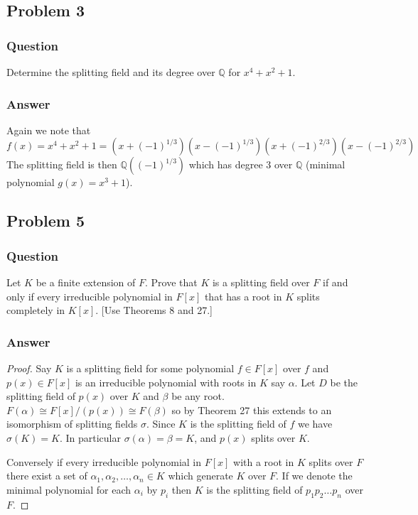 \documentclass[10pt]{article}
\begin{document}
\subsection{Problem 3}
\subsubsection{Question}
Determine the splitting field and its degree over $\mathbb{Q}$ for $x^4+x^2+1$.
\subsubsection{Answer}
Again we note that
\[f(x)=x^4+x^2+1=(x+(-1)^{1/3})(x-(-1)^{1/3})(x+(-1)^{2/3})(x-(-1)^{2/3})\]
The splitting field is then $\mathbb{Q}((-1)^{1/3})$ which has degree 3 over $\mathbb{Q}$ (minimal polynomial $g(x)=x^3+1$).

\subsection{Problem 5}
\subsubsection{Question}
Let $K$ be a finite extension of $F$. Prove that $K$ is a splitting field over $F$ if and only if every irreducible polynomial in $F[x]$ that has a root in $K$ splits completely in $K[x]$. [Use Theorems 8 and 27.]
\subsubsection{Answer}
\begin{proof}

Say $K$ is a splitting field for some polynomial $f \in F[x]$ over $f$ and $p(x) \in F[x]$ is an irreducible polynomial with roots in $K$ say $\alpha$. Let $D$ be the splitting field of $p(x)$ over $K$ and $\beta$ be any root. $F(\alpha)\cong F[x]/(p(x))\cong F(\beta)$ so by Theorem 27 this extends to an isomorphism of splitting fields $\sigma$. Since $K$ is the splitting field of $f$ we have $\sigma(K)=K$. In particular $\sigma(\alpha)=\beta=K$, and $p(x)$ splits over $K$.

Conversely if every irreducible polynomial in $F[x]$ with a root in $K$ splits over $F$ there exist a set of $\alpha_1, \alpha_2, \dots, \alpha_n \in K$ which generate $K$ over $F$. If we denote the minimal polynomial for each $\alpha_i$ by $p_i$ then $K$ is the splitting field of $p_1p_2 \dots p_n$ over $F$.

\end{proof}
\end{document}
